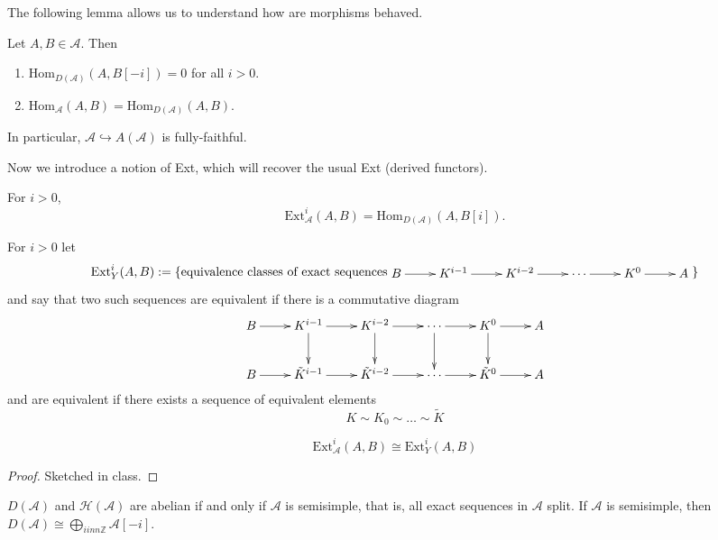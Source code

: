 \medskip
The following lemma allows us to understand how are morphisms behaved.

\begin{lemma}
\label{lemma-Homs}
Let $A,B \in \mathcal{A}$. Then
 \begin{enumerate}
\item $\text{Hom}_{D(\mathcal{A})}(A,B[-i])=0$ for all $i>0$.
\item $\text{Hom}_{\mathcal{A}}(A,B)=\text{Hom}_{D(\mathcal{A})}(A,B)$.
\end{enumerate}
In particular, $\mathcal{A} \hookrightarrow A(\mathcal{A})$ is fully-faithful.
\end{lemma}

Now we introduce a notion of Ext, which will recover the usual Ext (derived
functors).

\begin{definition}
\label{definition-Ext}
For $i>0$,
$$
\text{Ext}^i_{\mathcal{A}}(A,B)=\text{Hom}_{D(\mathcal{A})}(A,B[i]).
$$
\end{definition}

\begin{definition}[Yoneda]
\label{definition-Yoneda}
For $i>0$ let
$$
\text{Ext}_Y^i(A,B):=\{\text{equivalence classes of exact sequences}
\begin{aligned}
\xymatrix{
B\ar[r]&  K^{i-1}\ar[r]&  K^{i-2}\ar[r]& \cdots\ar[r]&K^0\ar[r]&A
}
\end{aligned}
\}
$$
and say that two such sequences are equivalent if there is a commutative diagram
$$
\xymatrix{
B\ar[r]&  K^{i-1}\ar[r]\ar[d]&  K^{i-2}\ar[r]\ar[d]& \cdots\ar[r]\ar[d]
&K^0\ar[r]\ar[d]&A\\
B\ar[r]&  \tilde{K}^{i-1}\ar[r]&  \tilde{K}^{i-2}\ar[r]& \cdots\ar[r]
&\tilde{K}^0\ar[r]&A
}
$$
and are equivalent if there exists a sequence of equivalent elements
$$
K \sim K_0 \sim \ldots \sim \tilde{K}
$$
\end{definition}

\begin{proposition}
\label{proposition-Ext}
$$
\text{Ext}_{\mathcal{A}}^i(A,B) \cong \text{Ext}_Y^i(A,B)
$$
\end{proposition}

\begin{proof}
Sketched in class.
\end{proof}

\begin{exercise}
\label{exercise-derived-and-homotopy-categories-abelian-characterization}
$D(\mathcal{A})$ and  $\mathcal{H}(\mathcal{A})$ are abelian if and only if
$\mathcal{A}$ is semisimple, that is, all exact sequences in $\mathcal{A}$
split. If $\mathcal{A}$ is semisimple, then $D(\mathcal{A})\cong \bigoplus_{i
inn \mathbb{Z}}\mathcal{A}[-i]$.
\end{exercise}

